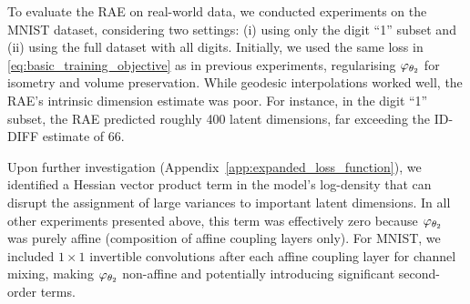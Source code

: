     
    To evaluate the RAE on real-world data, we conducted experiments on the MNIST dataset, considering two settings: (i) using only the digit ``1'' subset and (ii) using the full dataset with all digits. Initially, we used the same loss in \eqref{eq:basic_training_objective} as in previous experiments, regularising $\varphi_{\theta_2}$ for isometry and volume preservation. While geodesic interpolations worked well, the RAE's intrinsic dimension estimate was poor. For instance, in the digit ``1'' subset, the RAE predicted roughly 400 latent dimensions, far exceeding the ID-DIFF \cite{pmlr-v235-stanczuk24a} estimate of 66.
    
    Upon further investigation (Appendix~\ref{app:expanded_loss_function}), we identified a Hessian vector product term in the model’s log-density that can disrupt the assignment of large variances to important latent dimensions. In all other experiments presented above, this term was effectively zero because $\varphi_{\theta_2}$ was purely affine (composition of affine coupling layers only). For MNIST, we included $1 \times 1$ invertible convolutions after each affine coupling layer for channel mixing, making $\varphi_{\theta_2}$ non-affine and potentially introducing significant second-order terms.
    
